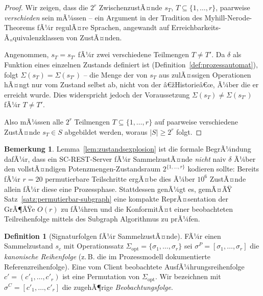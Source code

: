﻿\documentclass[a4paper,12pt]{article}
\theoremstyle{definition}
\newtheorem{definition}{Definition}
\newtheorem{bemerkung}{Bemerkung}
\begin{document}
\begin{proof}
	Wir zeigen, dass die $2^r$ ZwischenzustÃ¤nde $s_T$, $T \subseteq \{1,\ldots,r\}$,
	paarweise \emph{verschieden} sein mÃ¼ssen -- ein Argument in der Tradition des
	Myhill-Nerode-Theorems fÃ¼r regulÃ¤re Sprachen, angewandt auf
	Erreichbarkeits-Ã„quivalenzklassen von ZustÃ¤nden.

	Angenommen, $s_T = s_{T'}$ fÃ¼r zwei verschiedene Teilmengen $T \neq T'$. Da $\delta$
	als Funktion eines einzelnen Zustands definiert ist
	(Definition~\ref{def:prozessautomat}), folgt $\Sigma(s_T) = \Sigma(s_{T'})$ -- die
	Menge der von $s_T$ aus zulÃ¤ssigen Operationen hÃ¤ngt nur vom Zustand selbst ab, nicht
	von der â€žHistorieâ€œ, Ã¼ber die er erreicht wurde. Dies widerspricht jedoch der
	Voraussetzung $\Sigma(s_T) \neq \Sigma(s_{T'})$ fÃ¼r $T \neq T'$.

	Also mÃ¼ssen alle $2^r$ Teilmengen $T \subseteq \{1,\ldots,r\}$ auf paarweise
	verschiedene ZustÃ¤nde $s_T \in S$ abgebildet werden, woraus $|S| \geq 2^r$ folgt.
	\qedhere
\end{proof}

\begin{bemerkung}
	Lemma~\ref{lem:zustandsexplosion} ist die formale BegrÃ¼ndung dafÃ¼r, dass ein
	SC-REST-Server fÃ¼r SammelzustÃ¤nde \emph{nicht} naiv $\delta$ Ã¼ber den vollstÃ¤ndigen
	Potenzmengen-Zustandsraum $2^{\{1,\ldots,r\}}$ kodieren sollte: Bereits fÃ¼r $r=20$
	permutierbare Teilschritte ergÃ¤be dies Ã¼ber $10^6$ ZustÃ¤nde allein fÃ¼r diese eine
	Prozessphase. Stattdessen genÃ¼gt es, gemÃ¤ÃŸ Satz~\ref{satz:permutierbar-subgraph} eine
	kompakte ReprÃ¤sentation der GrÃ¶ÃŸe $O(r)$ zu fÃ¼hren und die KonformitÃ¤t einer
	beobachteten Teilreihenfolge mittels des Subgraph Algorithmus zu prÃ¼fen.
\end{bemerkung}

\begin{definition}[Signaturfolgen fÃ¼r SammelzustÃ¤nde]
	\label{def:signaturfolge-sammel}
	FÃ¼r einen Sammelzustand $s_c$ mit Operationssatz
	$\Sigma_{\mathrm{opt}}=\{\sigma_1,\ldots,\sigma_r\}$ sei $\sigma^P =
	[\sigma_1,\ldots,\sigma_r]$ die \emph{kanonische Reihenfolge} (z.\,B. die im
	Prozessmodell dokumentierte Referenzreihenfolge). Eine vom Client beobachtete
	AusfÃ¼hrungsreihenfolge $c' = (c'_1,\ldots,c'_r)$ ist eine Permutation von
	$\Sigma_{\mathrm{opt}}$. Wir bezeichnen mit $\sigma^{C}=[c'_1,\ldots,c'_r]$ die
	zugehÃ¶rige \emph{Beobachtungsfolge}.
\end{definition}
\end{document}
